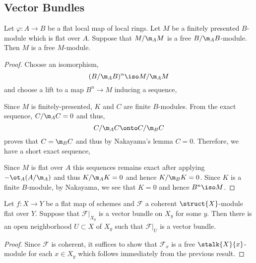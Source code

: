 \documentclass[12pt]{article}
\renewcommand{\F}{\mathcal{F}}
\begin{document}
\subsection{Vector Bundles}

\begin{prop}
Let $\varphi : A \to B$ be a flat local map of local rings. Let $M$ be a finitely presented $B$-module which is flat over $A$. Suppose that $M / \m_A M$ is a free $B / \m_A B$-module. Then $M$ is a free $M$-module. 
\end{prop}

\begin{proof}
Choose an isomorphism,
\[ (B / \m_A B)^n \iso M / \m_A M \]
and choose a lift to a map $B^n \to M$ inducing a sequence,
\begin{center}
\end{center}
Since $M$ is finitely-presented, $K$ and $C$ are finite $B$-modules. From the exact sequence, $C / \m_A C = 0$ and thus,
\[ C / \m_A C \onto C / \m_B C \]
proves that $C = \m_B C$ and thus by Nakayama's lemma $C = 0$. Therefore, we have a short exact sequence,
\begin{center}
\end{center}
Since $M$ is flat over $A$ this sequences remains exact after applying $- \ot_A (A/\m_A)$ and thus $K / \m_A K = 0$ and hence $K / \m_B K = 0$. Since $K$ is a finite $B$-module, by Nakayama, we see that $K = 0$ and hence $B^n \iso M$. 
\end{proof}

\begin{cor}
Let $f : X \to Y$ be a flat map of schemes and $\F$ a coherent $\struct{X}$-module flat over $Y$. Suppose that $\F|_{X_y}$ is a vector bundle on $X_y$ for some $y$. Then there is an open neighborhood $U \subset X$ of $X_y$ such that $\F|_U$ is a vector bundle.
\end{cor}

\begin{proof}
Since $\F$ is coherent, it suffices to show that $\F_x$ is a free $\stalk{X}{x}$-module for each $x \in X_y$ which follows immediately from the previous result.
\end{proof}
\end{document}
